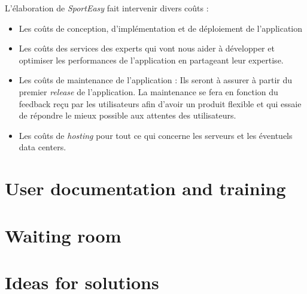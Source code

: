 L'élaboration de \textit{SportEasy} fait intervenir divers coûts :

\begin{itemize}

\item Les coûts de conception, d'implémentation et de déploiement de l'application

\item Les coûts des services des experts qui vont nous aider à développer et optimiser les performances de l'application en partageant leur expertise.

\item Les coûts de maintenance de l'application : Ils seront à assurer à partir du premier \textit{release} de l'application. La maintenance se fera en fonction du feedback reçu par les utilisateurs afin d'avoir un produit flexible et qui essaie de répondre le mieux possible aux attentes des utilisateurs.

\item Les coûts de \textit{hosting} pour tout ce qui concerne les serveurs et les éventuels data centers.

\end{itemize}

\section{User documentation and training}

\section{Waiting room}

\section{Ideas for solutions}

